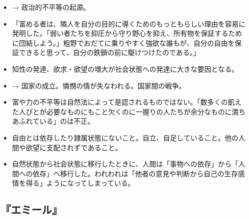 \documentclass[uplatex,dvipdfmx]{jsarticle} \usepackage{mystyle}%
\begin{document}
\begin{itemize}
\item → 政治的不平等の起源。

\item 「富める者は、隣人を自分の目的に導くためのもっともらしい理由を容易に発明した。「弱い者たちを抑圧から守り野心を抑え、所有物を保証するために団結しよう。」粗野でおだてに乗りやすく強欲な誰もが、自分の自由を保証できると思って、自分の鉄鎖の前に駆けつけたのである。」

\item 知性の発達、欲求・欲望の増大が社会状態への発達に大きな要因となる。
\item   → 国家の成立。憐憫の情が失なわれる。国家間の戦争。

\item 富や力の不平等は自然法によって是認されるものではない。「数多くの飢えた人びとが必要なものにもこと欠くのに一握りの人たちが余分なものに満ちあふれている」のは不正。

\item 自由とは依存したり隷属状態にないこと。自立、自足していること。他の人間や欲望に支配されずであること。

\item 自然状態から社会状態に移行したときに、人間は「事物への依存」から「人間への依存」へ移行した。われわれは「他者の意見や判断から自己の生存感情を得る」ようになってしまっている。

  \end{itemize}

\subsection{『エミール』}
\end{document}
